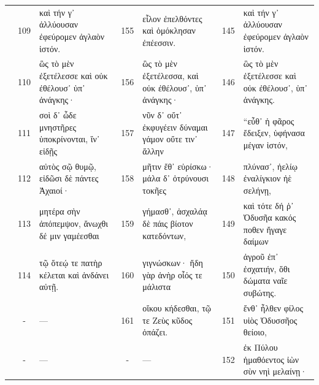 \documentclass[12pt]{article}
\begin{document}
\begin{table}
\begin{singlespacing}
\begin{tiny}
\begin{center}
\begin{tabularx}{\textheight}{
|c
||c
:>{\lefting\arraybackslash}X
||c
:>{\lefting\arraybackslash}X
||c
:>{\lefting\arraybackslash}X
|
}
& 109 & καὶ τήν γ᾿ ἀλλύουσαν ἐφεύρομεν ἀγλαὸν ἱστόν. & 155 & εἷλον ἐπελθόντες καὶ ὁμόκλησαν ἐπέεσσιν. & 145 & καὶ τήν γ᾿ ἀλλύουσαν ἐφεύρομεν ἀγλαὸν ἱστόν. \\
& 110 & ὣς τὸ μὲν ἐξετέλεσσε καὶ οὐκ ἐθέλουσ᾿ ὑπ᾿ ἀνάγκης· & 156 & ὣς τὸ μὲν ἐξετέλεσσα, καὶ οὐκ ἐθέλουσ᾿, ὑπ᾿ ἀνάγκης· & 146 & ὣς τὸ μὲν ἐξετέλεσσε καὶ οὐκ ἐθέλουσ᾿, ὑπ᾿ ἀνάγκης. \\
\hline
\parbox[c]{}{} & 111 & σοὶ δ᾿ ὧδε μνηστῆρες ὑποκρίνονται, ἵν᾿ εἰδῇς& 157 & νῦν δ᾿ οὔτ᾿ ἐκφυγέειν δύναμαι γάμον οὔτε τιν᾿ ἄλλην & 147 & “εὖθ᾿ ἡ φᾶρος ἔδειξεν, ὑφήνασα μέγαν ἱστόν, \\
& 112 & αὐτὸς σῷ θυμῷ, εἰδῶσι δὲ πάντες Ἀχαιοί· & 158 & μῆτιν ἔθ᾿ εὑρίσκω· μάλα δ᾿ ὀτρύνουσι τοκῆες & 148 & πλύνασ᾿, ἠελίῳ ἐναλίγκιον ἠὲ σελήνῃ, \\
& 113 & μητέρα σὴν ἀπόπεμψον, ἄνωχθι δέ μιν γαμέεσθαι & 159 & γήμασθ᾿, ἀσχαλάᾳ δὲ πάις βίοτον κατεδόντων, & 149 & καὶ τότε δή ῥ᾿ Ὀδυσῆα κακός ποθεν ἤγαγε δαίμων \\
& 114 & τῷ ὅτεῴ τε πατὴρ κέλεται καὶ ἁνδάνει αὐτῇ. & 160 & γιγνώσκων· ἤδη γὰρ ἀνὴρ οἷός τε μάλιστα & 150 & ἀγροῦ ἐπ᾿ ἐσχατιήν, ὅθι δώματα ναῖε συβώτης. \\
& - & --- & 161 & οἴκου κήδεσθαι, τῷ τε Ζεὺς κῦδος ὀπάζει. & 151 & ἔνθ᾿ ἦλθεν φίλος υἱὸς Ὀδυσσῆος θείοιο, \\
& - & --- & - & --- & 152 & ἐκ Πύλου ἠμαθόεντος ἰὼν σὺν νηὶ μελαίνῃ· \\
\hline

\end{tabularx}
\end{center}
\end{tiny}
\end{singlespacing}

\end{table}
\end{document}
